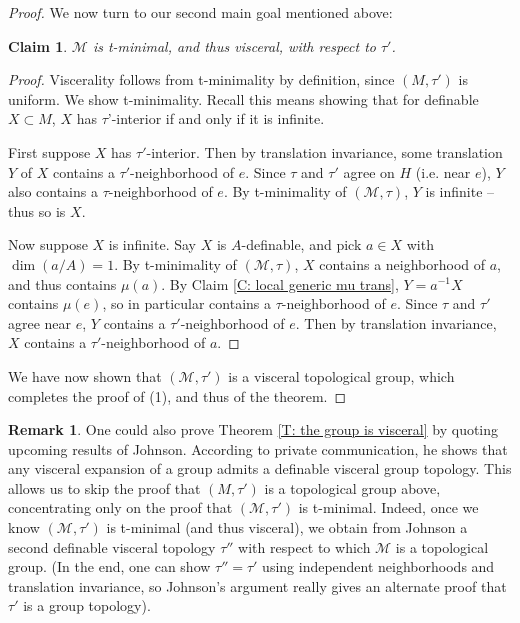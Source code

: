 \documentclass{amsart}
\newtheorem{claim}[theorem]{Claim}
\theoremstyle{definition}
\newtheorem{remark}[theorem]{Remark}
\begin{document}
\begin{proof}
    We now turn to our second main goal mentioned above:
    \begin{claim}
        $\mathcal M$ is t-minimal, and thus visceral, with respect to $\tau'$.
    \end{claim}
    \begin{proof}
        Viscerality follows from t-minimality by definition, since $(M,\tau')$ is uniform. We show t-minimality. Recall this means showing that for definable $X\subset M$, $X$ has $\tau$'-interior if and only if it is infinite.
        
        First suppose $X$ has $\tau'$-interior. Then by translation invariance, some translation $Y$ of $X$ contains a $\tau'$-neighborhood of $e$. Since $\tau$ and $\tau'$ agree on $H$ (i.e. near $e$), $Y$ also contains a $\tau$-neighborhood of $e$. By t-minimality of $(\mathcal M,\tau)$, $Y$ is infinite -- thus so is $X$.
        
        Now suppose $X$ is infinite. Say $X$ is $A$-definable, and pick $a\in X$ with $\dim(a/A)=1$. By t-minimality of $(\mathcal M,\tau)$, $X$ contains a neighborhood of $a$, and thus contains $\mu(a)$. By Claim \ref{C: local generic mu trans}, $Y=a^{-1}X$ contains $\mu(e)$, so in particular contains a $\tau$-neighborhood of $e$. Since $\tau$ and $\tau'$ agree near $e$, $Y$ contains a $\tau'$-neighborhood of $e$. Then by translation invariance, $X$ contains a $\tau'$-neighborhood of $a$.
    \end{proof}

    We have now shown that $(\mathcal M,\tau')$ is a visceral topological group, which completes the proof of (1), and thus of the theorem.
    \end{proof}

\begin{remark} One could also prove Theorem \ref{T: the group is visceral} by quoting upcoming results of Johnson. According to private communication, he shows that any visceral expansion of a group admits a definable visceral group topology. This allows us to skip the proof that $(M,\tau')$ is a topological group above, concentrating only on the proof that $(\mathcal M,\tau')$ is t-minimal. Indeed, once we know $(\mathcal M,\tau')$ is t-minimal (and thus visceral), we obtain from Johnson a second definable visceral topology $\tau''$ with respect to which $\mathcal M$ is a topological group. (In the end, one can show $\tau''=\tau'$ using independent neighborhoods and translation invariance, so Johnson's argument really gives an alternate proof that $\tau'$ is a group topology).
\end{remark}
\end{document}

